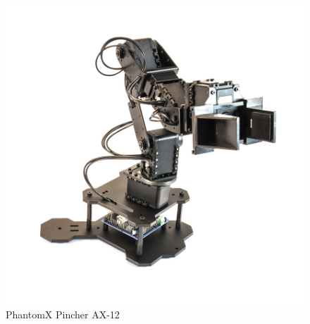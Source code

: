             \begin{figure}[H]
                \centering
                \includegraphics[scale=0.2]{Figures/Phantom_Pincher.jpg}
                    \caption{PhantomX Pincher AX-12}
                    \label{fig:Phantom_Pincher}
            \end{figure}

